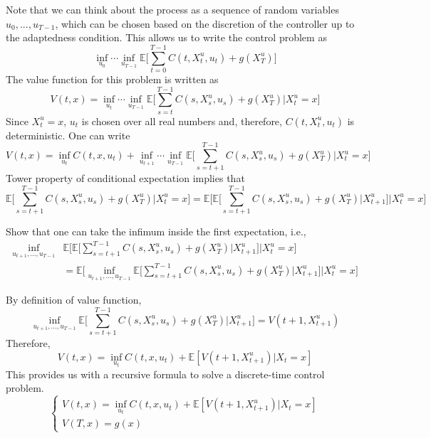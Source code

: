 \documentclass[11pt]{book}
\begin{document}
Note that we can think about the process as a sequence of random variables $u_0,...,u_{T-1}$, which can be chosen based on the discretion of the controller up to the adaptedness condition. This allows us to write the control problem as
\begin{equation}
    \inf_{u_0}\cdots\inf_{u_{T-1}} \mathbb{E}\bigg[\sum_{t=0}^{T-1}C(t,X^u_t,u_t)+g(X^u_T)\bigg]
\end{equation}
The value function for this problem is written as 
\begin{equation}
    V(t,x)= \inf_{u_t}\cdots\inf_{u_{T-1}} \mathbb{E}\bigg[\sum_{s=t}^{T-1}C(s,X^u_s,u_s)+g(X^u_T)\Big| X^u_t=x\bigg]
\end{equation}
Since $X^u_t=x$, $u_t$ is chosen over all real numbers and, therefore, $C(t,X^u_t,u_t)$ is deterministic. One can write
\begin{equation}
    V(t,x)= \inf_{u_t}
    C(t,x,u_t) +\inf_{u_{t+1}}\cdots\inf_{u_{T-1}} \mathbb{E}\bigg[\sum_{s=t+1}^{T-1}C(s,X^u_s,u_s)+g(X^u_T)\Big| X^u_t=x\bigg]
\end{equation}
Tower property of conditional expectation implies that 
\begin{equation}
    \mathbb{E} \bigg[\sum_{s=t+1}^{T-1}C(s,X^u_s,u_s)+g(X^u_T)\Big| X^u_t=x\bigg]= \mathbb{E}\bigg[\mathbb{E}\Big[\sum_{s=t+1}^{T-1}C(s,X^u_s,u_s)+g(X^u_T)\Big|X^u_{t+1}\Big]\Big| X^u_t=x\bigg]
\end{equation}
\begin{ex}
    Show that one can take the infimum inside the first expectation, i.e.,
    \begin{equation}
    \begin{split}
    \inf_{u_{t+1},...,u_{T-1}} &\mathbb{E} \bigg[\mathbb{E}\Big[\sum_{s=t+1}^{T-1}C(s,X^u_s,u_s)+g(X^u_T)\Big|X^u_{t+1}\Big]\Big| X^u_t=x\bigg]\\
    &= \mathbb{E} \bigg[\inf_{u_{t+1},...,u_{T-1}} \mathbb{E}\Big[\sum_{s=t+1}^{T-1} C(s,X^u_s,u_s)+g(X^u_T)\Big|X^u_{t+1}\Big]\Big| X^u_t=x\bigg]
    \end{split}
\end{equation}
\end{ex}
By definition of value function, 
\begin{equation}
    \inf_{u_{t+1},...,u_{T-1}} \mathbb{E}\Big[\sum_{s=t+1}^{T-1} C(s,X^u_s,u_s)+g(X^u_T)\Big|X^u_{t+1}\Big]=V(t+1,X^u_{t+1})
\end{equation}
Therefore,
\begin{equation}\label{one-step_DPP}
    V(t,x)= \inf_{u_t}
    C(t,x,u_t) + \mathbb{E}[V(t+1,X^u_{t+1})|X_t=x]
\end{equation}
This provides us with a recursive formula to solve a discrete-time control problem.
\begin{equation}\label{eqn:dpp_discrete}
    \begin{cases}
        V(t,x)= \inf_{u_t}
    C(t,x,u_t) + \mathbb{E}[V(t+1,X^u_{t+1})|X_t=x]\\
    V(T,x)=g(x)
    \end{cases}
\end{equation}
\end{document}

